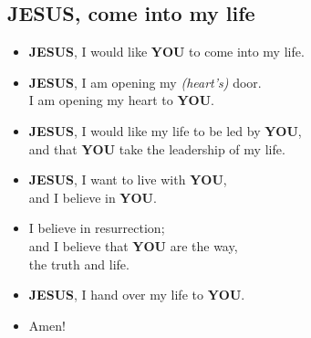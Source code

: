 \documentclass[10pt,a5paper]{article}
\newcommand{\Jesus}[0]{\textbf{JESUS}}
\newcommand{\You}[0]{\textbf{YOU}}
\begin{document}
	\subsection{{\Jesus}, come into my life}
		\begin{itemize}[nosep]
			\item	{\Jesus},
					I would like {\You} to come into my life.
			\item	{\Jesus},
					I am opening my \textit{(heart's)} door.
					\\
					I am opening my heart to {\You}.
			\item	{\Jesus},
					I would like my life to be led by {\You},
					\\
					and that {\You} take the leadership of my life.
			\item	{\Jesus},
					I want to live with {\You},
					\\
					and I believe in {\You}.
			\item	I believe in resurrection;
					\\
					and I believe that {\You} are the way,
					\\
					the truth and life.
			\item	{\Jesus},
					I hand over my life to {\You}.
			\item	Amen!
		\end{itemize}
\end{document}
